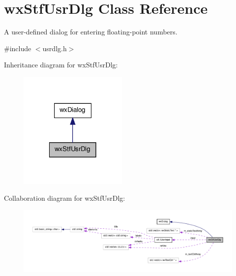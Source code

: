 \hypertarget{classwxStfUsrDlg}{
\section{wxStfUsrDlg Class Reference}
\label{classwxStfUsrDlg}
}


A user-\/defined dialog for entering floating-\/point numbers.  




{\ttfamily \#include $<$usrdlg.h$>$}



Inheritance diagram for wxStfUsrDlg:
\nopagebreak
\begin{figure}[H]
\begin{center}
\leavevmode
\includegraphics[width=150pt]{classwxStfUsrDlg__inherit__graph}
\end{center}
\end{figure}


Collaboration diagram for wxStfUsrDlg:
\nopagebreak
\begin{figure}[H]
\begin{center}
\leavevmode
\includegraphics[width=400pt]{classwxStfUsrDlg__coll__graph}
\end{center}
\end{figure}
